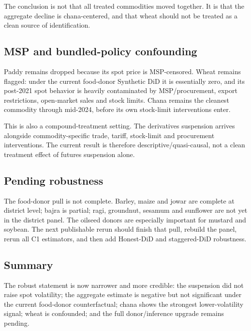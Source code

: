 The conclusion is not that all treated commodities moved together. It is that the
aggregate decline is chana-centered, and that wheat should not be treated as a clean
source of identification.

\subsection{MSP and bundled-policy confounding}

Paddy remains dropped because its spot price is MSP-censored. Wheat remains flagged:
under the current food-donor Synthetic DiD it is essentially zero, and its post-2021
spot behavior is heavily contaminated by MSP/procurement, export restrictions, open-market
sales and stock limits. Chana remains the cleanest commodity through mid-2024, before
its own stock-limit interventions enter.

This is also a compound-treatment setting. The derivatives suspension arrives alongside
commodity-specific trade, tariff, stock-limit and procurement interventions. The current
result is therefore descriptive/quasi-causal, not a clean treatment effect of futures
suspension alone.

\subsection{Pending robustness}

The food-donor pull is not complete. Barley, maize and jowar are complete at district
level; bajra is partial; ragi, groundnut, sesamum and sunflower are not yet in the
district panel. The oilseed donors are especially important for mustard and soybean.
The next publishable rerun should finish that pull, rebuild the panel, rerun all C1
estimators, and then add Honest-DiD and staggered-DiD robustness.

\subsection{Summary}

The robust statement is now narrower and more credible: the suspension did not raise
spot volatility; the aggregate estimate is negative but not significant under the
current food-donor counterfactual; chana shows the strongest lower-volatility signal;
wheat is confounded; and the full donor/inference upgrade remains pending.
